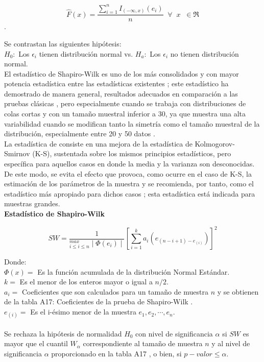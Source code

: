 \begin{center}
	$$\hat{F}(x)=\frac{\sum_{i=1}^n I_{(- \infty,x)}(e_i)}{n}  \;\; \forall \;\; x \;\; \in \Re$$.
\end{center}

Se contrastan las siguientes hipótesis:\\

$H_0:$ Los $\epsilon_i$ tienen distribución normal vs. $H_a:$ Los $\epsilon_i$ no tienen distribución normal.\\

El estadístico de Shapiro-Wilk es uno de los más consolidados y con mayor potencia estadística entre las estadísticas existentes \parencite{arcone-2006}; este estadístico ha demostrado de manera general, resultados adecuados en comparación a las pruebas clásicas \parencite{arcone-2006}, pero especialmente cuando se trabaja con distribuciones de colas cortas \parencite{thadewald-2007} y con un tamaño muestral inferior a 30, ya que muestra una alta variabilidad cuando se modifican tanto la simetría como el tamaño muestral de la distribución, especialmente entre 20 y 50 datos \parencite{yazici-2007}.\\

La estadística de \textcite{Lilliefors-1967} consiste en una mejora de la estadística de Kolmogorov- Smirnov (K-S), sustentada sobre los mismos principios estadísticos, pero específica para aquellos casos en donde la media y la varianza son desconocidas. De este modo, se evita el efecto que provoca, como ocurre en el caso de K-S, la estimación de los parámetros de la muestra \parencite{steinskog-2007} y se recomienda, por tanto, como el estadístico más apropiado para dichos casos \parencite{oztuna-2006}; esta estadística está indicada para muestras grandes.\\


\textbf{Estadístico de Shapiro-Wilk}


\begin{center}
 $$SW=\frac{1}{^{max}_{i\leq i \leq n} \mid \Phi (e_i) \mid}[\sum_{i=1}^k a_i(e_{(n-i+1)-e_(i)})]^2$$
\end{center}


Donde:\\
$\Phi (x) =$ Es la función acumulada de la distribución Normal Estándar.\\
$k =$ Es el menor de los enteros mayor o igual a $n/2$.\\
$a_i =$ Coeficientes que son calculados para un tamaño de muestra $n$ y se obtienen de la tabla A17: Coeficientes de la prueba de Shapiro-Wilk \parencite{conover-1999}.\\
$e_{(i)} =$ Es el i-ésimo menor de la muestra $e_1, e_2, \cdots , e_n$.\\\\
Se rechaza la hipótesis de normalidad $H_0$ con nivel de significancia $\alpha$ si $SW$ es mayor que el cuantil $W_{\alpha}$ correspondiente al tamaño de muestra $n$ y al nivel de significancia $\alpha$ proporcionado en la tabla A17 \parencite{conover-1999}, o bien, si $p-valor \leq \alpha$.\\



